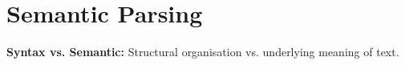 \begin{comment}
	\pagebreak
\end{comment}

\section{Semantic Parsing}
\begin{comment}
\subsection{Structure}

	\begin{itemize}
	
	\item Logical Forms
	\begin{itemize}
	\item Meaning in Linguistic
	\item Language in logical forms
	\end{itemize}
	
	\item Lambda Calculus
	\begin{itemize}
	\item Compositionality
	\item Components
	\item Combinators
	\end{itemize}
	
	\item CCG
	\begin{itemize}
	\item Motivation
	\item Linear Indexed Grammars
	\item Formal definition
	\end{itemize}
	
	\item Parsing Algorithms
	\begin{itemize}
	\item CKY style Algorithm
	\item Polynomial time algorithm
	\item Parsing in action
	\end{itemize}
	
	\end{itemize}
\end{comment}
\textbf{Syntax vs. Semantic:} Structural organisation vs. underlying meaning of text.\\
